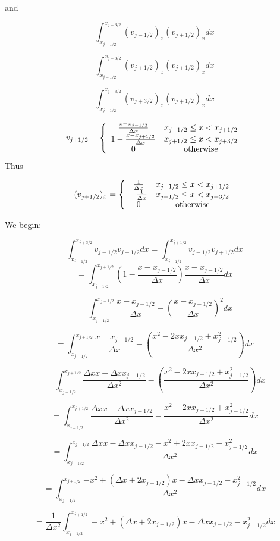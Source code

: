 \documentclass[12pt]{article}
\begin{document}
and 

\[\int_{x_{j-1/2}}^{x_{j+3/2}}(v_{j- 1/2})_x(v_{j+ 1/2})_x dx\]

\[\int_{x_{j-1/2}}^{x_{j+3/2}}(v_{j+ 1/2})_x(v_{j+ 1/2})_x dx\]

\[\int_{x_{j-1/2}}^{x_{j+3/2}}(v_{j+ 3/2})_x(v_{j+ 1/2})_x dx\]


\[v_{j + 1/2} = \left\lbrace \begin{array}{c c}
\frac{x - x_{j-1/2}}{\Delta x}  & x_{j - 1/2} \le x < x_{j+1/2} \\
1 - \frac{x - x_{j+1/2}}{\Delta x}  & x_{j + 1/2} \le x < x_{j+3/2}\\
0 & \text{otherwise}
\end{array} \right.\]
Thus

\[(v_{j + 1/2})_{x} = \left\lbrace \begin{array}{c c}
\frac{1}{\Delta x}  & x_{j - 1/2} \le x < x_{j+1/2} \\
- \frac{1}{\Delta x}  & x_{j + 1/2} \le x < x_{j+3/2}\\
0 & \text{otherwise}
\end{array} \right.\]

We begin:

\[\int_{x_{j-1/2}}^{x_{j+3/2}}v_{j- 1/2}v_{j+ 1/2} dx = \int_{x_{j-1/2}}^{x_{j+1/2}}v_{j- 1/2}v_{j+ 1/2} dx \]
\[ = \int_{x_{j-1/2}}^{x_{j+1/2}}(1 - \frac{x - x_{j-1/2}}{\Delta x})\frac{x - x_{j-1/2}}{\Delta x} dx \]

\[ = \int_{x_{j-1/2}}^{x_{j+1/2}}\frac{x - x_{j-1/2}}{\Delta x} - \left(\frac{x - x_{j-1/2}}{\Delta x}\right)^2 dx \]

\[ = \int_{x_{j-1/2}}^{x_{j+1/2}}\frac{x - x_{j-1/2}}{\Delta x} - \left(\frac{x^2 - 2x x_{j-1/2} + x^2_{j-1/2}}{\Delta x^2}\right) dx \]

\[ = \int_{x_{j-1/2}}^{x_{j+1/2}}\frac{\Delta x x - \Delta x x_{j-1/2}}{\Delta x^2} - \left(\frac{x^2 - 2x x_{j-1/2} + x^2_{j-1/2}}{\Delta x^2}\right)dx \]

\[ = \int_{x_{j-1/2}}^{x_{j+1/2}}\frac{\Delta x x - \Delta x x_{j-1/2}}{\Delta x^2} - \frac{x^2 - 2x x_{j-1/2} + x^2_{j-1/2}}{\Delta x^2} dx \]

\[ = \int_{x_{j-1/2}}^{x_{j+1/2}}\frac{\Delta x x - \Delta x x_{j-1/2} - x^2 + 2x x_{j-1/2} - x^2_{j-1/2}}{\Delta x^2} dx \]

\[ = \int_{x_{j-1/2}}^{x_{j+1/2}}\frac{- x^2  +(\Delta x + 2x_{j-1/2} ) x - \Delta x x_{j-1/2} - x^2_{j-1/2}}{\Delta x^2} dx \]

\[ = \frac{1}{\Delta x^2}\int_{x_{j-1/2}}^{x_{j+1/2}}- x^2  +(\Delta x + 2x_{j-1/2} ) x - \Delta x x_{j-1/2} - x^2_{j-1/2} dx \]
\end{document}
